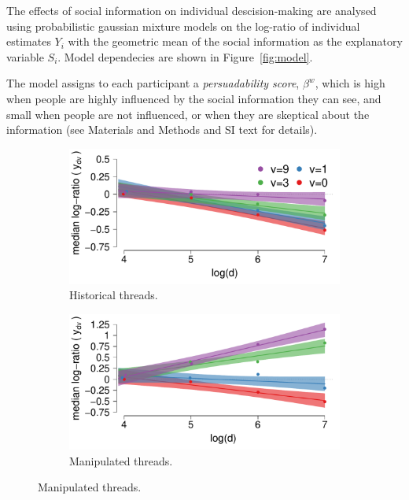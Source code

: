 \documentclass[9pt,a4paper,twocolumn,lineno]{article}
\begin{document}
The effects of social information on individual descision-making are analysed using probabilistic gaussian mixture models on the log-ratio of individual estimates $Y_i$ with the geometric mean of the social information as the explanatory variable $S_i$. Model dependecies are shown in Figure~\ref{fig:model}. 

The model assigns to each participant a \textit{persuadability score}, $\beta^w$, which is high when people are highly influenced by the social information they can see, and small when people are not influenced, or when they are skeptical about the information (see Materials and Methods and SI text for details). 

\begin{figure}[t]
\centering
	\begin{subfigure}[t]{.46\linewidth}
		\centering
		\includegraphics[width=1\linewidth]{med_confidence_h.pdf}	
		\caption{\footnotesize Historical threads.}
		\label{fig: median confidence bounds - historic}
	\end{subfigure}
	\begin{subfigure}[t]{.46\linewidth}
		\centering
		\includegraphics[width=1\linewidth]{med_confidence_m.pdf}		
		\caption{\footnotesize Manipulated threads.}
		\label{fig: median confidence bounds - manipulated}

\end{subfigure}
\end{figure}
\end{document}
